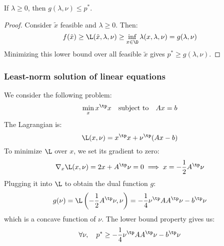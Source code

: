 \begin{property}
    If $\lambda\geq0$, then $g(\lambda, \nu)\leq p^*$.
\end{property}
\begin{proof}
    Consider $\tilde{x}$ feasible and $\lambda\geq0$. Then:
    \begin{equation*}
        f(\tilde{x})\geq\L(\tilde{x},\lambda,\nu) \geq \inf_{x\in\D} \lambda(x,\lambda, \nu) = g(\lambda, \nu)
    \end{equation*}
    Minimizing this lower bound over all feasible $\tilde{x}$ gives $p^*\geq g(\lambda, \nu)$.
\end{proof}

\subsubsection{Least-norm solution of linear equations}
We consider the following problem:
\begin{equation*}
    \min_x x^\tp x \quad\text{subject to}\quad Ax=b
\end{equation*}
The Lagrangian is:
\begin{equation*}
    \L(x, \nu) = x^\tp x + \nu^\tp(Ax-b)
\end{equation*}
To minimize $\L$ over $x$, we set its gradient to zero:
\begin{equation*}
    \nabla_x\L(x, \nu) = 2x + A^\tp\nu = 0 \implies x = -\frac{1}{2}A^\tp\nu
\end{equation*}
Plugging it into $\L$ to obtain the dual function $g$:
\begin{equation*}
    g(\nu) = \L\left(-\frac{1}{2}A^\tp\nu, \nu\right) = -\frac{1}{4}\nu^\tp AA^\tp\nu - b^\tp\nu
\end{equation*}
which is a concave function of $\nu$. The lower bound property gives us:
\begin{equation*}
    \forall\nu, \quad p^* \geq -\frac{1}{4}\nu^\tp AA^\tp\nu - b^\tp\nu
\end{equation*}

